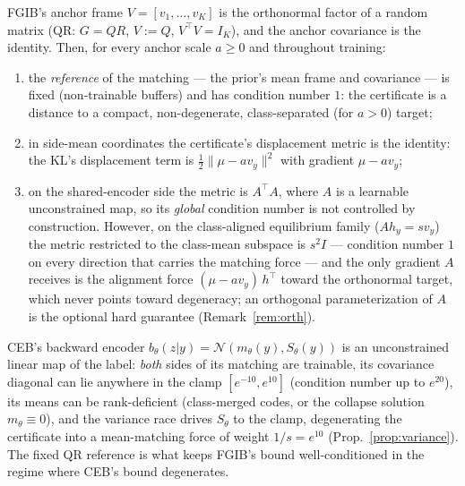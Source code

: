 \begin{proposition}\label{prop:conditioning}
FGIB's anchor frame $V = [v_1, \dots, v_K]$ is the orthonormal factor of a random matrix
(QR: $G = QR$, $V := Q$, $V^{\top}V = I_K$), and the anchor covariance is the identity.
Then, for every anchor scale $a \ge 0$ and throughout training:
\begin{enumerate}
\item[(i)] the \emph{reference} of the matching --- the prior's mean frame and
covariance --- is fixed (non-trainable buffers) and has condition number $1$: the
certificate is a distance to a compact, non-degenerate, class-separated (for $a > 0$)
target;
\item[(ii)] in side-mean coordinates the certificate's displacement metric is the
identity: the KL's displacement term is $\tfrac12\|\mu - a v_y\|^2$ with gradient
$\mu - a v_y$;
\item[(iii)] on the shared-encoder side the metric is $A^{\top}A$, where $A$ is a
learnable unconstrained map, so its \emph{global} condition number is not controlled by
construction. However, on the class-aligned equilibrium family ($A h_y = s v_y$) the
metric restricted to the class-mean subspace is $s^2 I$ --- condition number $1$ on
every direction that carries the matching force --- and the only gradient $A$ receives
is the alignment force $(\mu - a v_y)\,h^{\top}$ toward the orthonormal target, which
never points toward degeneracy; an orthogonal parameterization of $A$ is the optional
hard guarantee (Remark~\ref{rem:orth}).
\end{enumerate}
CEB's backward encoder $b_\theta(z|y) = \mathcal{N}(m_\theta(y), S_\theta(y))$ is an
unconstrained linear map of the label: \emph{both} sides of its matching are trainable,
its covariance diagonal can lie anywhere in the clamp $[e^{-10}, e^{10}]$ (condition
number up to $e^{20}$), its means can be rank-deficient (class-merged codes, or the
collapse solution $m_\theta \equiv 0$), and the variance race drives $S_\theta$ to the
clamp, degenerating the certificate into a mean-matching force of weight $1/s = e^{10}$
(Prop.~\ref{prop:variance}). The fixed QR reference is what keeps FGIB's bound
well-conditioned in the regime where CEB's bound degenerates.
\end{proposition}

